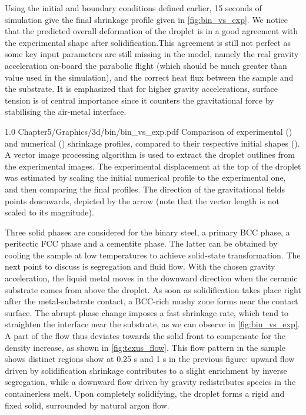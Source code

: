 Using the initial and boundary conditions defined earlier, 15 seconds of simulation give the final shrinkage profile given in \cref{fig:bin_vs_exp}.
We notice that the predicted overall deformation of the droplet is in a good agreement with the experimental shape after solidification.This agreement is
still not perfect as some key input parameters are still missing in the model, namely the real gravity acceleration on-board the parabolic flight (which should
be much greater than value used in the simulation), and the correct heat flux between the sample and the substrate. It is emphasized that for higher gravity
accelerations, surface tension is of central importance since it counters the gravitational force by stabilising the air-metal interface.

\begin{figureth}
{1.0}
{Chapter5/Graphics/3d/bin/bin_vs_exp.pdf}
{Comparison of experimental () and numerical () shrinkage profiles, compared to their respective initial shapes (). 
A vector image processing algorithm is used to extract the droplet outlines from the experimental images. 
The experimental displacement at the top of the droplet was estimated by scaling 
the initial numerical profile to the experimental one, and then comparing the final profiles.
The direction of the gravitational fields points downwards, depicted
  by the arrow (note that the vector length is not scaled to its magnitude).}
\label{fig:bin_vs_exp}
\end{figureth}

Three solid phases are considered for the binary steel, a primary BCC phase, a peritectic FCC phase and a cementite phase. The latter can be obtained by cooling
the sample at low temperatures to achieve solid-state transformation.
The next point to discuss is segregation and fluid flow. With the chosen gravity acceleration, the liquid metal moves in the downward direction when the
ceramic substrate comes from above the droplet. As soon as solidification takes place right after the metal-substrate contact, a BCC-rich mushy zone 
forms near the contact surface. The abrupt phase change imposes a fast shrinkage rate, which tend to straighten the interface near the substrate, as we can observe in \cref{fig:bin_vs_exp}. 
A part of the flow thus deviates towards the solid front 
to compensate for the density increase, as shown in \cref{fig:texus_flow}. 
This flow pattern in the sample shows distinct regions show at 0.25 s and 1 s in the previous figure: 
upward flow driven by solidification shrinkage contributes to a slight enrichment by inverse segregation,
while a downward flow driven by gravity redistributes species in the containerless melt. Upon completely 
solidifying, the droplet forms a rigid and fixed solid, surrounded by natural argon flow. 

